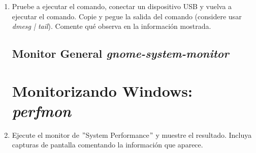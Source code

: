 \documentclass[paper=a4, fontsize=11pt]{scrartcl} %
\numberwithin{equation}{section} %
\numberwithin{figure}{section} %
\numberwithin{table}{section} %
\begin{document}
\begin{enumerate}
		En principio, el demonio \textit{cron}\cite{man_cron} ejecuta los comandos siguiendo las
		instrucciones dadas por el archivo \textit{crontab}\cite{man_crontab} y dispone además de una
		serie de repositorios con el fin de almacenar scripts con una periodicidad particular:
		\begin{itemize}
			\item \verb|/etc/cron.d| para ejecuciones de cualquier periodicidad.
			\item \verb|/etc/cron.hourly| para ejecuciones cada hora.
			\item \verb|/etc/cron.dialy| para ejecuciones cada día.
			\item \verb|/etc/cron.weekly| para ejecuciones cada semana.
			\item \verb|/etc/cron.monthly| para ejecuciones cada mes.
		\end{itemize}
		
		Para la tarea que nos piden realizar, creamos el siguiente script\footnote{He incluido el script
		directamente y se tienen ciertos errores en la visualización del $\%$.}:
		
		
		
		Y como queremos programar que la tarea se repita de forma diaria, la incluiremos en el directorio
		\verb|/etc/cron.dialy/| anteriormente mencionado.
		
	\subsection{Analizando qué ocurre en el \textit{kernel} con \textit{dmesg}}
		\item Pruebe a ejecutar el comando, conectar un dispositivo USB y vuelva a ejecutar el
		comando. Copie y pegue la salida del comando (considere usar \textit{dmesg | tail}). Comente
		qué observa en la información mostrada.
		
	\subsection{Monitor General \textit{gnome-system-monitor}}
	\section{Monitorizando Windows: \textit{perfmon}}
		\item Ejecute el monitor de $"$System Performance$"$ y muestre el resultado. Incluya capturas
		de pantalla comentando la información que aparece.
		

\end{enumerate}
\end{document}
